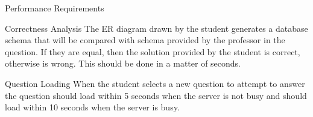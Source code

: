 \documentclass{article}
\begin{document}
\begin{section}{Performance Requirements}

    \begin{subsection}{Correctness Analysis}
    The ER diagram drawn by the student generates a database schema that will be compared with schema provided by the professor in the question. If they are equal, then the solution provided by the student is correct, otherwise is wrong. This should be done in a matter of seconds.
    \end{subsection}
    
    \begin{subsection}{Question Loading}
    When the student selects a new question to attempt to answer the question should load within 5 seconds when the server is not busy and should load within 10 seconds when the server is busy.
    \end{subsection}
    
\end{section}
\end{document}
